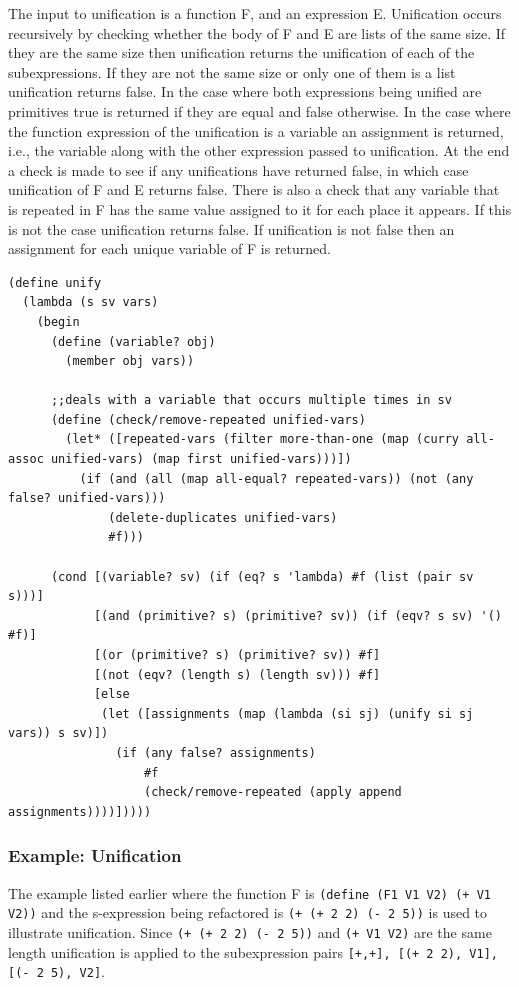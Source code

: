 \documentclass[a4paper,10pt]{article}
\begin{document}
The input to unification is a function F, and an expression E.  Unification occurs recursively by checking whether the body of F and E are lists of the same size.  If they are the same size then unification returns the unification of each of the subexpressions.  If they are not the same size or only one of them is a list unification returns false.  In the case where both expressions being unified are primitives true is returned if they are equal and false otherwise.  In the case where the function expression of the unification is a variable an assignment is returned, i.e., the variable along with the other expression passed to unification.  At the end a check is made to see if any unifications have returned false, in which case unification of F and E returns false.  There is also a check that any variable that is repeated in F has the same value assigned to it for each place it appears.  If this is not the case unification returns false. If unification is not false then an assignment for each unique variable of F is returned.

\begin{lstlisting}[frame=trBL]
(define unify
  (lambda (s sv vars)
    (begin
      (define (variable? obj)
        (member obj vars))

      ;;deals with a variable that occurs multiple times in sv
      (define (check/remove-repeated unified-vars)
        (let* ([repeated-vars (filter more-than-one (map (curry all-assoc unified-vars) (map first unified-vars)))])
          (if (and (all (map all-equal? repeated-vars)) (not (any false? unified-vars)))
              (delete-duplicates unified-vars)
              #f)))
      
      (cond [(variable? sv) (if (eq? s 'lambda) #f (list (pair sv s)))]
            [(and (primitive? s) (primitive? sv)) (if (eqv? s sv) '() #f)]
            [(or (primitive? s) (primitive? sv)) #f]
            [(not (eqv? (length s) (length sv))) #f]
            [else
             (let ([assignments (map (lambda (si sj) (unify si sj vars)) s sv)])
               (if (any false? assignments)
                   #f
                   (check/remove-repeated (apply append assignments))))]))))
\end{lstlisting}
\subsubsection{Example: Unification}
The example listed earlier where the function F is \texttt{(define (F1 V1 V2) (+ V1 V2))} and the s-expression being refactored is \texttt{(+ (+ 2 2) (- 2 5))} is used to illustrate unification.  Since \texttt{(+ (+ 2 2) (- 2 5))} and \texttt{(+ V1 V2)} are the same length unification is applied to the subexpression pairs \texttt{[+,+], [(+ 2 2), V1], [(- 2 5), V2]}.
\end{document}
